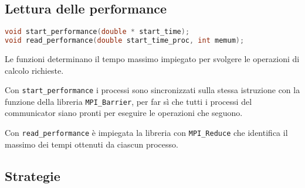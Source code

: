 \documentclass[a4paper,11pt]{book}
\begin{document}
\subsection{Lettura delle performance}
\begin{lstlisting}[language=C]
void start_performance(double * start_time);
void read_performance(double start_time_proc, int memum);
\end{lstlisting}
Le funzioni determinano il tempo massimo impiegato per svolgere le operazioni di calcolo richieste. \par 
Con \verb|start_performance| i processi sono sincronizzati sulla stessa istruzione con la funzione della libreria \verb|MPI_Barrier|, per far sì che tutti i processi del communicator siano pronti per eseguire le operazioni che seguono. \par 
Con \verb|read_performance| è impiegata la libreria con \verb|MPI_Reduce| che identifica il massimo dei tempi ottenuti da ciascun processo. 

\subsection{Strategie}
\end{document}
